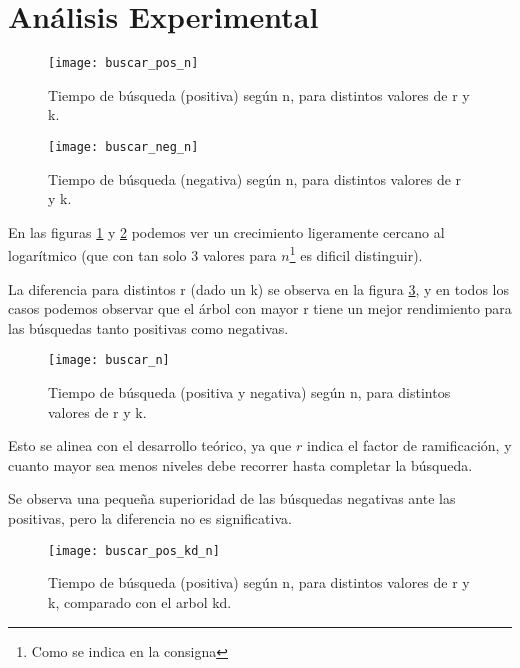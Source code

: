 \section{Análisis Experimental}

\begin{figure}
  \begin{center}
  \texttt{[image: buscar\_pos\_n]}
  \caption{Tiempo de búsqueda (positiva)
    según n, para distintos valores de r y k.}
  \label{fig:buscar-pos}
  \end{center}
\end{figure}


\begin{figure}
  \begin{center}
  \texttt{[image: buscar\_neg\_n]}
  \caption{Tiempo de búsqueda (negativa)
    según n, para distintos valores de r y k.}
  \label{fig:buscar-neg}
  \end{center}
\end{figure}

En las figuras \ref{fig:buscar-pos} y \ref{fig:buscar-neg} podemos
ver un crecimiento ligeramente cercano al logarítmico (que con tan solo 3
valores para \(n\)\footnote{Como se indica en la consigna} es dificil
distinguir).

La diferencia para distintos r (dado un k) se observa en la figura
\ref{fig:buscar}, y en todos los casos podemos observar que el árbol
con mayor r tiene un mejor rendimiento para las búsquedas tanto positivas como
negativas.

\begin{figure}
  \begin{center}
  \texttt{[image: buscar\_n]}
  \caption{Tiempo de búsqueda (positiva y negativa)
    según n, para distintos valores de r y k.}
  \label{fig:buscar}
  \end{center}
\end{figure}

Esto se alinea con el desarrollo teórico, ya que \(r\) indica el factor de
ramificación, y cuanto mayor sea menos niveles debe recorrer hasta completar la
búsqueda.

Se observa una pequeña superioridad de las búsquedas negativas ante las positivas,
pero la diferencia no es significativa.

\begin{figure}
  \begin{center}
  \texttt{[image: buscar\_pos\_kd\_n]}
  \caption{Tiempo de búsqueda (positiva)
    según n, para distintos valores de r y k, comparado con el arbol kd.}
  \label{fig:pos-kd}
  \end{center}
\end{figure}


